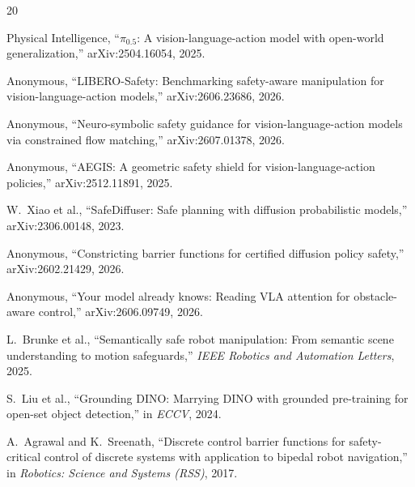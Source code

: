 \documentclass[conference]{IEEEtran}
\begin{document}

\begin{thebibliography}{20}

 Physical Intelligence, ``$\pi_{0.5}$: A vision-language-action model with open-world generalization,'' arXiv:2504.16054, 2025.

 Anonymous, ``LIBERO-Safety: Benchmarking safety-aware manipulation for vision-language-action models,'' arXiv:2606.23686, 2026.

 Anonymous, ``Neuro-symbolic safety guidance for vision-language-action models via constrained flow matching,'' arXiv:2607.01378, 2026.

 Anonymous, ``AEGIS: A geometric safety shield for vision-language-action policies,'' arXiv:2512.11891, 2025.

 W.~Xiao et al., ``SafeDiffuser: Safe planning with diffusion probabilistic models,'' arXiv:2306.00148, 2023.

 Anonymous, ``Constricting barrier functions for certified diffusion policy safety,'' arXiv:2602.21429, 2026.

 Anonymous, ``Your model already knows: Reading VLA attention for obstacle-aware control,'' arXiv:2606.09749, 2026.

 L.~Brunke et al., ``Semantically safe robot manipulation: From semantic scene understanding to motion safeguards,'' \emph{IEEE Robotics and Automation Letters}, 2025.

 S.~Liu et al., ``Grounding DINO: Marrying DINO with grounded pre-training for open-set object detection,'' in \emph{ECCV}, 2024.

 A.~Agrawal and K.~Sreenath, ``Discrete control barrier functions for safety-critical control of discrete systems with application to bipedal robot navigation,'' in \emph{Robotics: Science and Systems (RSS)}, 2017.

\end{thebibliography}
\end{document}

